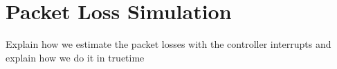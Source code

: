 \section{Packet Loss Simulation}

Explain how we estimate the packet losses with the controller interrupts and explain how we do it in truetime